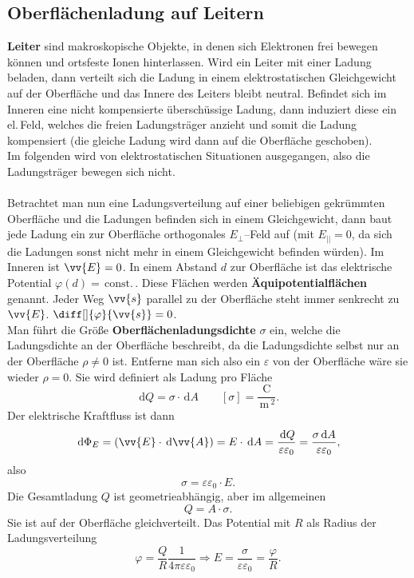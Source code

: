 \documentclass[a4paper,12pt]{article}
\newcommand{\td}{\,\text{d}}
\begin{document}
\subsection{Oberflächenladung auf Leitern}
\textbf{Leiter} sind makroskopische Objekte, in denen sich Elektronen frei bewegen können und ortsfeste Ionen hinterlassen. Wird ein Leiter mit einer Ladung \glqq beladen\grqq{}, dann verteilt sich die Ladung in einem elektrostatischen Gleichgewicht auf der Oberfläche und das Innere des Leiters bleibt neutral. Befindet sich im Inneren eine nicht kompensierte überschüssige Ladung, dann induziert diese ein el.\,Feld, welches die freien Ladungsträger anzieht und somit die Ladung kompensiert (die gleiche Ladung wird dann auf die Oberfläche geschoben).\\\indent
Im folgenden wird von elektrostatischen Situationen ausgegangen, also die Ladungsträger bewegen sich nicht.\\\\\indent
Betrachtet man nun eine Ladungsverteilung auf einer beliebigen gekrümmten Oberfläche und die Ladungen befinden sich in einem Gleichgewicht, dann baut jede Ladung ein zur Oberfläche orthogonales $E_{\perp}$--Feld auf (mit $E_{||}=0$, da sich die Ladungen sonst nicht mehr in einem Gleichgewicht befinden würden). Im Inneren ist $\vv{E}=0$. In einem Abstand $d$ zur Oberfläche ist das elektrische Potential $\varphi \left(d\right)=\,\text{const.}\,$. Diese Flächen werden \textbf{Äquipotentialflächen} genannt. Jeder Weg $\vv{s}$ parallel zu der Oberfläche steht immer senkrecht zu $\vv{E}$. $\diff[]{\varphi }{\vv{s}}=0$.\\\indent
Man führt die Größe \textbf{Oberflächenladungsdichte} $\sigma $ ein, welche die Ladungsdichte an der Oberfläche beschreibt, da die Ladungsdichte selbst nur an der Oberfläche $\rho \neq 0$ ist. Entferne man sich also ein $\varepsilon $ von der Oberfläche wäre sie wieder $\rho =0$. Sie wird definiert als Ladung pro Fläche
\[ 
        \td Q=\sigma \cdot \td A\qquad \left[\sigma \right]=\dfrac{\,\text{C}\,}{\,\text{m}\,^2}
.\] 
Der elektrische Kraftfluss ist dann
\[ 
        \td \Phi _E=\left(\vv{E}\cdot \td \vv{A}\right)=E\cdot \td A=\dfrac{\td Q}{\varepsilon \varepsilon _0}=\dfrac{\sigma \td A}{\varepsilon \varepsilon _0}
,\] 
also
\[ 
        \sigma =\varepsilon \varepsilon _0\cdot E
.\] 
Die Gesamtladung $Q$ ist geometrieabhängig, aber im allgemeinen
\[ 
        Q=A\cdot \sigma 
.\] 
Sie ist auf der Oberfläche gleichverteilt. Das Potential mit $R$ als Radius der Ladungsverteilung
\[ 
        \varphi =\dfrac{Q}{R}\dfrac{1}{4\pi \varepsilon \varepsilon _0}\Rightarrow E=\dfrac{\sigma }{\varepsilon \varepsilon _0}=\dfrac{\varphi }{R}
.\] 
\end{document}

